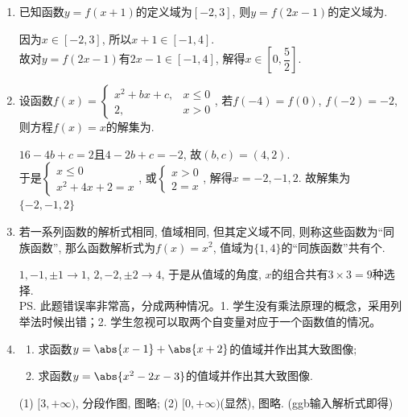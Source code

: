 \begin{enumerate}
\item 已知函数$y=f(x+1)$的定义域为$[-2,3]$, 则$y=f(2x-1)$的定义域为.
\begin{jieda}
因为$x\in[-2,3]$, 所以$x+1\in[-1,4]$.\\
故对$y=f(2x-1)$有$2x-1\in[-1,4]$, 解得$x\in\left[0,\dfrac{5}{2}\right]$.
\end{jieda}

\item 设函数$f(x)=\begin{cases}
x^2+bx+c, & x\leq 0\\
2, & x>0
\end{cases}$, 
若$f(-4)=f(0)$, $f(-2)=-2$, 则方程$f(x)=x$的解集为.
\begin{jieda}
$16-4b+c=2$且$ 4-2b+c=-2$, 故$(b,c)=(4,2)$. \\
于是$\begin{cases}
x\leq 0\\
x^2+4x+2=x
\end{cases}$, 或$\begin{cases}
x>0\\
2=x
\end{cases}$, 解得$x=-2,-1,2$. 
故解集为$\{-2,-1,2\}$
\end{jieda}

\item 若一系列函数的解析式相同, 值域相同, 但其定义域不同, 则称这些函数为``同族函数'', 
那么函数解析式为$f(x)=x^2$, 值域为$\{1,4\}$的``同族函数''共有个.
\begin{jieda}
$1,-1,\pm1\to 1$, $2,-2,\pm2\to 4$, 于是从值域的角度, $x$的组合共有$3\times3=9$种选择. \\
\ps 此题错误率非常高，分成两种情况。1. 学生没有乘法原理的概念，采用列举法时候出错；2. 学生忽视可以取两个自变量对应于一个函数值的情况。
\end{jieda} 

\item 
\begin{enumerate}
\item 求函数$y=\abs{x-1}+\abs{x+2}$的值域并作出其大致图像; 
\item 求函数$y=\abs{x^2-2x-3}$的值域并作出其大致图像. 
\end{enumerate}
\begin{jieda}
(1) $[3,+\infty)$, 分段作图, 图略; (2) $[0,+\infty)$(显然), 图略. (ggb输入解析式即得)
\end{jieda}
\begin{vspace_}
\vsp[3]
\end{vspace_}


\end{enumerate}
